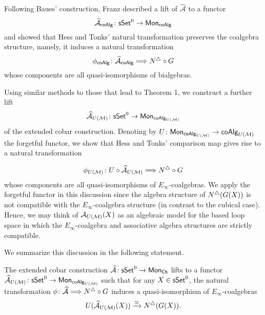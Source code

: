 Following Baues’ construction, Franz described a lift of $\widehat{\mathcal{A}}$ to a functor
$$\widehat{\mathcal{A}}_{\mathsf{coAlg}} \colon \mathsf{sSet}^0 \to \mathsf{Mon}_{\mathsf{coAlg}}$$ and showed that Hess and Tonks' natural transformation preserves the coalgebra structure, namely, it induces a natural transformation
$$\phi_{\mathsf{coAlg}} \colon \widehat{\mathcal{A}}_{\mathsf{coAlg}} \Longrightarrow N^{\triangle} \circ G$$
whose components are all quasi-isomorphisms of bialgebras.

Using similar methods to those that lead to Theorem 1, we construct a further lift
$$\widehat{\mathcal{A}}_{U(\mathcal{M})} \colon \mathsf{sSet}^0 \to \mathsf{Mon}_{\mathsf{coAlg}_{U(\mathcal{M})}}$$
of the extended cobar construction. Denoting by $U \colon \mathsf{Mon}_{\mathsf{coAlg}_{U(\mathcal{M})}} \to \mathsf{coAlg}_{U(\mathcal{M})}$ the forgetful functor, we show that Hess and Tonks' comparison map gives rise to a natural transformation

$$\phi_{U(\mathcal{M})} \colon U \circ \widehat{\mathcal{A}}_{U(\mathcal{M})} \Longrightarrow N^{\triangle} \circ G$$
whose components are all quasi-isomorphisms of $E_{\infty}$-coalgebras.  We apply the forgetful functor in this discussion since the algebra structure of $N^{\triangle}(G(X))$ is not compatible with the $E_{\infty}$-coalgebra structure (in contrast to the cubical case). Hence, we may think of $\mathcal{A}_{U(\mathcal{M})}(X)$ as an algebraic model for the based loop space in which the $E_{\infty}$-coalgebra and associative algebra structures are strictly compatible. 


We summarize this discussion in the following statement.
\begin{theorem} The extended cobar construction $\widehat{\mathcal{A}} \colon \mathsf{sSet}^0 \to \mathsf{Mon}_{\mathsf{Ch}}$ lifts to a functor $\widehat{\mathcal{A}}_{U(\mathcal{M})} \colon \mathsf{sSet}^0 \to \mathsf{Mon}_{\mathsf{coAlg}_{U(\mathcal{M})}}$ such that for any $X \in \mathsf{sSet}^0$, the natural transformation $\phi \colon \widehat{\mathcal{A}} \Longrightarrow N^{\triangle} \circ G$ induces a quasi-isomorphism of $E_{\infty}$-coalgebras
$$  U(\widehat{\mathcal{A}}_{U(\mathcal{M})}(X)) \xrightarrow{\simeq} N^{\triangle}(G(X)).$$
\end{theorem}




